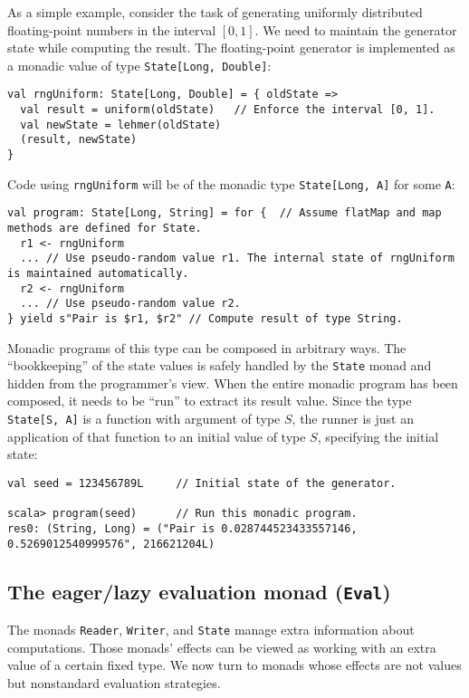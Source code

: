 As a simple example, consider the task of generating uniformly distributed
floating-point numbers in the interval $\left[0,1\right]$. We need
to maintain the generator state while computing the result. The floating-point
generator is implemented as a monadic value of type \lstinline!State[Long, Double]!:
\begin{lstlisting}
val rngUniform: State[Long, Double] = { oldState =>
  val result = uniform(oldState)   // Enforce the interval [0, 1].
  val newState = lehmer(oldState)
  (result, newState)
}
\end{lstlisting}
Code using \lstinline!rngUniform! will be of the monadic type \lstinline!State[Long, A]!
for some \lstinline!A!:
\begin{lstlisting}
val program: State[Long, String] = for {  // Assume flatMap and map methods are defined for State.
  r1 <- rngUniform
  ... // Use pseudo-random value r1. The internal state of rngUniform is maintained automatically.
  r2 <- rngUniform
  ... // Use pseudo-random value r2.
} yield s"Pair is $r1, $r2" // Compute result of type String.
\end{lstlisting}

Monadic programs of this type can be composed in arbitrary ways. The
\textsf{``}bookkeeping\textsf{''} of the state values is safely handled by the \lstinline!State!
monad and hidden from the programmer\textsf{'}s view. When the entire monadic
program has been composed, it needs to be \textsf{``}run\textsf{''} to extract its
result value. Since the type \lstinline!State[S, A]! is a function
with argument of type $S$, the runner is just
an application of that function to an initial value of type $S$,
specifying the initial state:
\begin{lstlisting}
val seed = 123456789L     // Initial state of the generator.

scala> program(seed)      // Run this monadic program.
res0: (String, Long) = ("Pair is 0.028744523433557146, 0.5269012540999576", 216621204L)
\end{lstlisting}


\subsection{The eager/lazy evaluation monad (\texttt{Eval})\label{subsec:The-eager-lazy-evaluation-monad}}

The monads \lstinline!Reader!, \lstinline!Writer!, and \lstinline!State!
manage extra information about computations. Those monads\textsf{'}
effects can be viewed as working with an extra value of a certain
fixed type. We now turn to monads whose effects are not values but
nonstandard evaluation strategies. 

